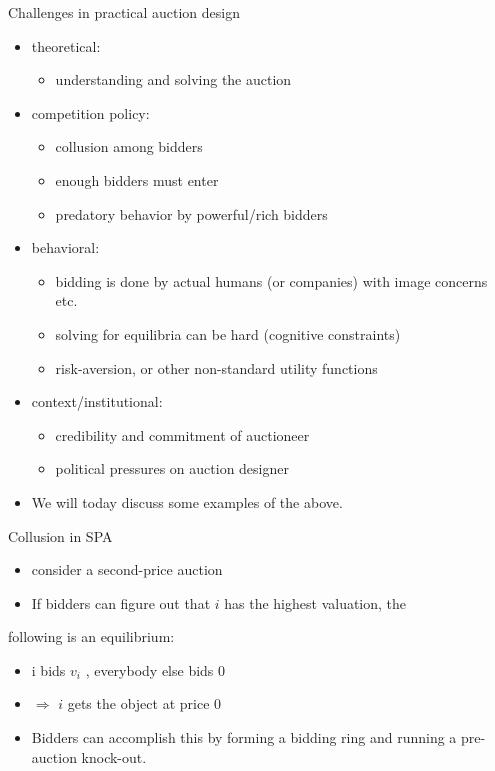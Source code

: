 \documentclass[bigger]{beamer}
\newcommand{\Ra}{\Rightarrow} \newcommand{\ra}{\rightarrow} \newcommand{\Lra}{\Leftrightarrow}
\begin{document}
\begin{frame}[label={sec:org519cb39}]{Challenges in practical auction design}
\begin{itemize}
\item theoretical:
\begin{itemize}
\item understanding and solving the auction
\end{itemize}
\item competition policy:
\begin{itemize}
\item collusion among bidders
\item enough bidders must enter
\item predatory behavior by powerful/rich bidders
\end{itemize}
\item behavioral:
\begin{itemize}
\item bidding is done by actual humans (or companies) with image concerns etc.
\item solving for equilibria can be hard (cognitive constraints)
\item risk-aversion, or other non-standard utility functions
\end{itemize}
\item context/institutional:
\begin{itemize}
\item credibility and commitment of auctioneer
\item political pressures on auction designer
\end{itemize}
\item We will today discuss some examples of the above.
\end{itemize}
\end{frame}

\begin{frame}[label={sec:orgfa6f882}]{Collusion in SPA}
\begin{itemize}
\item consider a second-price auction
\item If bidders can ﬁgure out that \(i\) has the highest valuation, the
\end{itemize}
following is an equilibrium:
\begin{itemize}
\item i bids \(v_i\) , everybody else bids 0
\item \(\Ra\) \(i\) gets the object at price 0
\end{itemize}
\begin{itemize}
\item Bidders can accomplish this by forming a bidding ring and running a pre-auction knock-out.
\end{itemize}
\end{frame}
\end{document}
